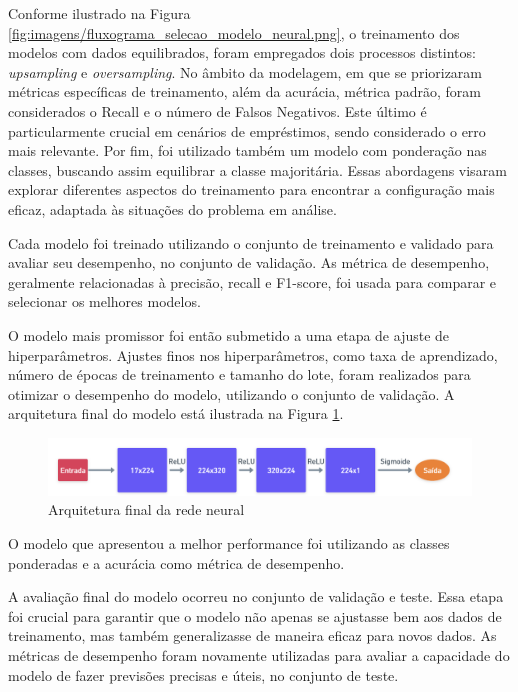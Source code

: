 Conforme ilustrado na Figura \ref{fig:imagens/fluxograma_selecao_modelo_neural.png}, o treinamento dos modelos com dados equilibrados, foram empregados dois processos distintos: 
\textit{upsampling} e \textit{oversampling}. No âmbito da modelagem, em que se priorizaram métricas específicas
de treinamento, além da acurácia, métrica padrão, foram considerados o Recall 
e o número de Falsos Negativos. Este último é particularmente crucial em cenários de empréstimos, sendo considerado
o erro mais relevante. Por fim, foi utilizado também um modelo com ponderação nas classes, buscando assim equilibrar 
a classe majoritária. Essas abordagens visaram explorar diferentes aspectos do treinamento para encontrar a 
configuração mais eficaz, adaptada às situações do problema em análise.

Cada modelo foi treinado utilizando 
o conjunto de treinamento e validado para avaliar seu desempenho, no conjunto de validação. 
As métrica de desempenho, geralmente relacionadas
à precisão, recall e F1-score, foi usada para comparar e selecionar os melhores modelos.

O modelo mais promissor foi então submetido a uma etapa de ajuste de hiperparâmetros. Ajustes finos nos 
hiperparâmetros, como taxa de aprendizado, número de épocas de treinamento e tamanho do lote, 
foram realizados para otimizar o desempenho do modelo, utilizando o conjunto de validação.
A arquitetura final do modelo está ilustrada na Figura \ref{fig:imagens/arquitetura_redeneural_vencedor.png}.


\begin{figure}[H]
  \centering
  \includegraphics[width=1\textwidth]{imagens/arquitetura_redeneural_vencedor.png}
  \caption{Arquitetura final da rede neural}
  \label{fig:imagens/arquitetura_redeneural_vencedor.png}
\end{figure}

O modelo que apresentou a melhor performance foi utilizando as classes ponderadas e a acurácia como métrica de desempenho.

A avaliação final do modelo ocorreu no conjunto de validação e teste. Essa etapa foi crucial 
para garantir que o modelo não apenas se ajustasse bem aos dados de treinamento, mas também 
generalizasse de maneira eficaz para novos dados. As métricas de desempenho foram novamente
utilizadas para avaliar a capacidade do modelo de fazer previsões precisas e úteis, no conjunto de teste.

